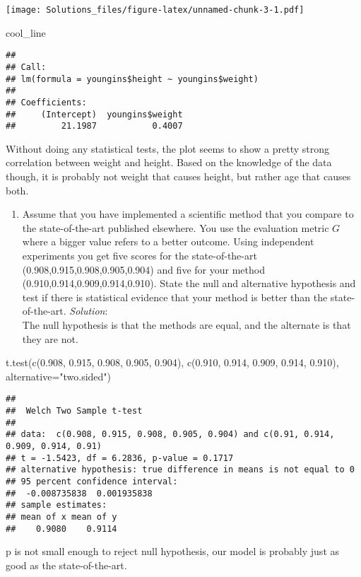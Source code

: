 \documentclass[
]{article}
\newenvironment{Shaded}{\begin{snugshade}}{\end{snugshade}}
\newcommand{\AttributeTok}[1]{\textcolor[rgb]{0.77,0.63,0.00}{#1}}
\newcommand{\FloatTok}[1]{\textcolor[rgb]{0.00,0.00,0.81}{#1}}
\newcommand{\FunctionTok}[1]{\textcolor[rgb]{0.00,0.00,0.00}{#1}}
\newcommand{\NormalTok}[1]{#1}
\newcommand{\StringTok}[1]{\textcolor[rgb]{0.31,0.60,0.02}{#1}}
\providecommand{\tightlist}{%
  \setlength{\itemsep}{0pt}\setlength{\parskip}{0pt}}
\begin{document}
\texttt{[image: Solutions\_files/figure-latex/unnamed-chunk-3-1.pdf]}

\begin{Shaded}
\begin{Highlighting}[]
\NormalTok{cool\_line}
\end{Highlighting}
\end{Shaded}

\begin{verbatim}
## 
## Call:
## lm(formula = youngins$height ~ youngins$weight)
## 
## Coefficients:
##     (Intercept)  youngins$weight  
##         21.1987           0.4007
\end{verbatim}

Without doing any statistical tests, the plot seems to show a pretty
strong correlation between weight and height. Based on the knowledge of
the data though, it is probably not weight that causes height, but
rather age that causes both.

\begin{enumerate}
\def\labelenumi{(\alph{enumi})}
\setcounter{enumi}{3}
\tightlist
\item
  Assume that you have implemented a scientific method that you compare
  to the state-of-the-art published elsewhere. You use the evaluation
  metric \(G\) where a bigger value refers to a better outcome. Using
  independent experiments you get five scores for the state-of-the-art
  (0.908,0.915,0.908,0.905,0.904) and five for your method
  (0.910,0.914,0.909,0.914,0.910). State the null and alternative
  hypothesis and test if there is statistical evidence that your method
  is better than the state-of-the-art. \emph{Solution}:\\
  The null hypothesis is that the methods are equal, and the alternate
  is that they are not.
\end{enumerate}

\begin{Shaded}
\begin{Highlighting}[]
\FunctionTok{t.test}\NormalTok{(}\FunctionTok{c}\NormalTok{(}\FloatTok{0.908}\NormalTok{, }\FloatTok{0.915}\NormalTok{, }\FloatTok{0.908}\NormalTok{, }\FloatTok{0.905}\NormalTok{, }\FloatTok{0.904}\NormalTok{), }\FunctionTok{c}\NormalTok{(}\FloatTok{0.910}\NormalTok{, }\FloatTok{0.914}\NormalTok{, }\FloatTok{0.909}\NormalTok{, }\FloatTok{0.914}\NormalTok{, }\FloatTok{0.910}\NormalTok{), }\AttributeTok{alternative=}\StringTok{"two.sided"}\NormalTok{)}
\end{Highlighting}
\end{Shaded}

\begin{verbatim}
## 
##  Welch Two Sample t-test
## 
## data:  c(0.908, 0.915, 0.908, 0.905, 0.904) and c(0.91, 0.914, 0.909, 0.914, 0.91)
## t = -1.5423, df = 6.2836, p-value = 0.1717
## alternative hypothesis: true difference in means is not equal to 0
## 95 percent confidence interval:
##  -0.008735838  0.001935838
## sample estimates:
## mean of x mean of y 
##    0.9080    0.9114
\end{verbatim}

p is not small enough to reject null hypothesis, our model is probably
just as good as the state-of-the-art.
\end{document}
